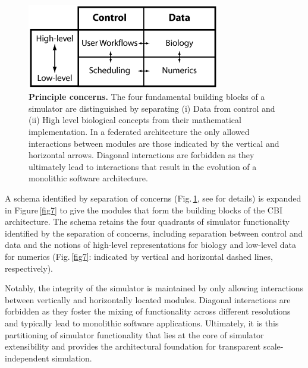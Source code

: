 \documentclass[10pt,letterpaper]{article}
\begin{document}
\begin{figure}[ht]
\begin{center}
\includegraphics[width=0.75\textwidth]{figures/pone.0028956.g002.png}
\end{center}
\caption{\small{\textbf{Principle concerns.} The four fundamental building blocks of a simulator are distinguished by separating (i) Data from control and (ii) High level biological concepts from their mathematical implementation. In a federated architecture the only allowed interactions between modules are those indicated by the vertical and horizontal arrows. Diagonal interactions are forbidden as they ultimately lead to interactions that result in the evolution of a monolithic software architecture.}}
\label{fig6}
\end{figure}

A schema identified by separation of concerns (Fig.\,\ref{fig6}, see \cite{cornelis12} for details) is expanded in Figure\,\ref{fig7} to give the modules that form the building blocks of the CBI architecture.  The schema retains the four quadrants of simulator functionality identified by the separation of concerns, including separation between control and data  and the notions of high-level representations for biology and low-level data for numerics (Fig.\,\ref{fig7}: indicated by vertical and horizontal dashed lines, respectively).

Notably, the integrity of the simulator is maintained by only allowing interactions between vertically and horizontally located modules. Diagonal interactions are forbidden as they foster the mixing of functionality across different resolutions and typically lead to monolithic software applications. Ultimately, it is this partitioning of simulator functionality that lies at the core of simulator extensibility and provides the architectural foundation for transparent scale-independent simulation.
\end{document}
